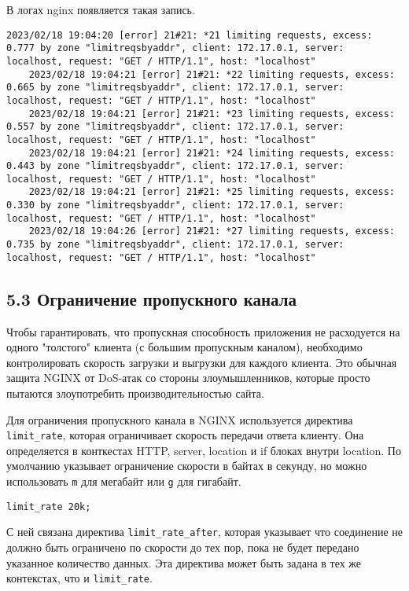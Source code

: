 В логах nginx появляется такая запись.

\begin{Verbatim}[frame=single,breaklines=true,breakanywhere=true]
    2023/02/18 19:04:20 [error] 21#21: *21 limiting requests, excess: 0.777 by zone "limitreqsbyaddr", client: 172.17.0.1, server: localhost, request: "GET / HTTP/1.1", host: "localhost"
    2023/02/18 19:04:21 [error] 21#21: *22 limiting requests, excess: 0.665 by zone "limitreqsbyaddr", client: 172.17.0.1, server: localhost, request: "GET / HTTP/1.1", host: "localhost"
    2023/02/18 19:04:21 [error] 21#21: *23 limiting requests, excess: 0.557 by zone "limitreqsbyaddr", client: 172.17.0.1, server: localhost, request: "GET / HTTP/1.1", host: "localhost"
    2023/02/18 19:04:21 [error] 21#21: *24 limiting requests, excess: 0.443 by zone "limitreqsbyaddr", client: 172.17.0.1, server: localhost, request: "GET / HTTP/1.1", host: "localhost"
    2023/02/18 19:04:21 [error] 21#21: *25 limiting requests, excess: 0.330 by zone "limitreqsbyaddr", client: 172.17.0.1, server: localhost, request: "GET / HTTP/1.1", host: "localhost"
    2023/02/18 19:04:26 [error] 21#21: *27 limiting requests, excess: 0.735 by zone "limitreqsbyaddr", client: 172.17.0.1, server: localhost, request: "GET / HTTP/1.1", host: "localhost"
\end{Verbatim}

\subsection*{5.3 Ограничение пропускного канала}

Чтобы гарантировать, что пропускная способность приложения не расходуется на одного "толстого" клиента (с большим пропускным каналом), необходимо контролировать скорость загрузки и выгрузки для каждого клиента. Это обычная защита NGINX от DoS-атак со стороны злоумышленников, которые просто пытаются злоупотребить производительностью сайта.

Для ограничения пропускного канала в NGINX используется директива \texttt{limit\_rate}, которая ограничивает скорость передачи ответа клиенту. Она определяется в конткестах HTTP, server, location и if блоках внутри location. По умолчанию указывает ограничение скорости в байтах в секунду, но можно использовать \texttt{m} для мегабайт или \texttt{g} для гигабайт.

\texttt{limit\_rate 20k;}

С ней связана директива \texttt{limit\_rate\_after}, которая указывает что соединение не должно быть ограничено по скорости до тех пор, пока не будет передано указанное количество данных. Эта директива может быть задана в тех же контекстах, что и \texttt{limit\_rate}.

